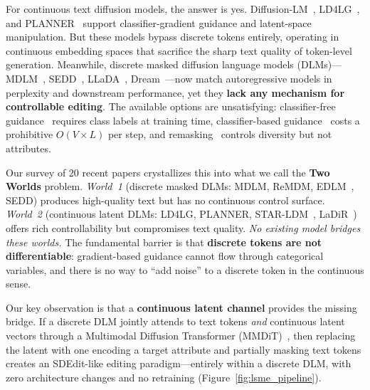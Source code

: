 \documentclass{article}
\begin{document}
For continuous text diffusion models, the answer is yes.
Diffusion-LM~\citep{li2022}, LD4LG~\citep{lovelace2023}, and PLANNER~\citep{zhang2023} support classifier-gradient guidance and latent-space manipulation.
But these models bypass discrete tokens entirely, operating in continuous embedding spaces that sacrifice the sharp text quality of token-level generation.
Meanwhile, discrete masked diffusion language models (DLMs)---MDLM~\citep{sahoo2024}, SEDD~\citep{lou2024}, LLaDA~\citep{nie2025llada}, Dream~\citep{liu2025dream}---now match autoregressive models in perplexity and downstream performance, yet they \textbf{lack any mechanism for controllable editing}.
The available options are unsatisfying: classifier-free guidance~\citep{nisonoff2025} requires class labels at training time, classifier-based guidance~\citep{nisonoff2025} costs a prohibitive $O(V \times L)$ per step, and remasking~\citep{arriola2025remdm} controls diversity but not attributes.

Our survey of 20 recent papers crystallizes this into what we call the \textbf{Two Worlds} problem.
\textit{World~1} (discrete masked DLMs: MDLM, ReMDM, EDLM~\citep{xu2025edlm}, SEDD) produces high-quality text but has no continuous control surface.
\textit{World~2} (continuous latent DLMs: LD4LG, PLANNER, STAR-LDM~\citep{lovelace2025starlm}, LaDiR~\citep{ladir2025}) offers rich controllability but compromises text quality.
\emph{No existing model bridges these worlds.}
The fundamental barrier is that \textbf{discrete tokens are not differentiable}: gradient-based guidance cannot flow through categorical variables, and there is no way to ``add noise'' to a discrete token in the continuous sense.

Our key observation is that a \textbf{continuous latent channel} provides the missing bridge.
If a discrete DLM jointly attends to text tokens \emph{and} continuous latent vectors through a Multimodal Diffusion Transformer (MMDiT)~\citep{esser2024}, then replacing the latent with one encoding a target attribute and partially masking text tokens creates an SDEdit-like editing paradigm---entirely within a discrete DLM, with zero architecture changes and no retraining (Figure~\ref{fig:lsme_pipeline}).
\end{document}
